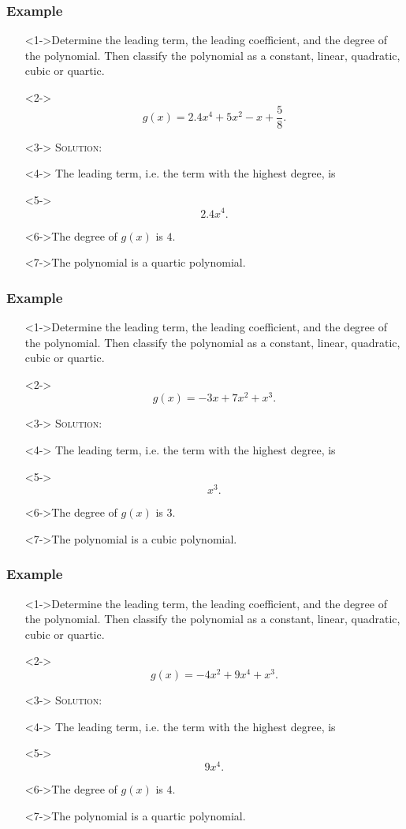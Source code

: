 \documentclass{beamer}
\begin{document}
\begin{frame}
	\frametitle{Example} 
	\begin{enumerate}
		\item[]<1->Determine the leading term, the leading coefficient, and the degree of the polynomial.  Then classify the polynomial as a constant, linear, quadratic, cubic or quartic.  
		\item[]<2-> 
		\[
			g(x)=2.4x^{4}+5x^{2}-x+\frac{5}{8}. 
		\]
		\item[]<3-> \textsc{Solution:} 
		\item[]<4-> The leading term, i.e. the term with the highest degree, is  
		\item[]<5-> \[ 2.4x^{4}. \]
		\item[]<6->The degree of $g(x)$ is $4$.  
		\item[]<7->The polynomial is a quartic polynomial.  
	\end{enumerate}
\end{frame}

\begin{frame}
	\frametitle{Example} 
	\begin{enumerate}
		\item[]<1->Determine the leading term, the leading coefficient, and the degree of the polynomial.  Then classify the polynomial as a constant, linear, quadratic, cubic or quartic.  
		\item[]<2-> 
		\[
			g(x)=-3x+7x^{2}+x^{3}. 
		\]
		\item[]<3-> \textsc{Solution:} 
		\item[]<4-> The leading term, i.e. the term with the highest degree, is  
		\item[]<5-> \[ x^{3}. \]
		\item[]<6->The degree of $g(x)$ is $3$.  
		\item[]<7->The polynomial is a cubic polynomial.  
	\end{enumerate}
\end{frame}

\begin{frame}
	\frametitle{Example} 
	\begin{enumerate}
		\item[]<1->Determine the leading term, the leading coefficient, and the degree of the polynomial.  Then classify the polynomial as a constant, linear, quadratic, cubic or quartic.  
		\item[]<2-> 
		\[
			g(x)=-4x^{2}+9x^{4}+x^{3}. 
		\]
		\item[]<3-> \textsc{Solution:} 
		\item[]<4-> The leading term, i.e. the term with the highest degree, is  
		\item[]<5-> \[ 9x^{4}. \]
		\item[]<6->The degree of $g(x)$ is $4$.  
		\item[]<7->The polynomial is a quartic polynomial.  
	\end{enumerate}
\end{frame}
\end{document}
